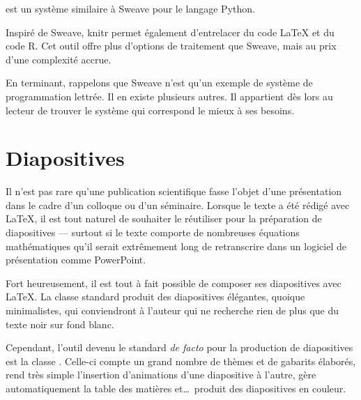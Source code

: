  est un système similaire à
Sweave pour le langage Python.

Inspiré de Sweave, knitr \citep{knitr} permet également d'entrelacer
du code {\LaTeX} et du code R. Cet outil offre plus d'options de
traitement que Sweave, mais au prix d'une complexité accrue.

En terminant, rappelons que Sweave n'est qu'un exemple de système de
programmation lettrée. Il en existe plusieurs autres. Il appartient
dès lors au lecteur de trouver le système qui correspond le mieux à
ses besoins.



\section{Diapositives}
\label{sec:trucs:diapositives}

Il n'est pas rare qu'une publication scientifique fasse l'objet d'une
présentation dans le cadre d'un colloque ou d'un séminaire. Lorsque le
texte a été rédigé avec {\LaTeX}, il est tout naturel de souhaiter le
réutiliser pour la préparation de diapositives --- surtout si le texte
comporte de nombreuses équations mathématiques qu'il serait
extrêmement long de retranscrire dans un logiciel de présentation
comme PowerPoint.

Fort heureusement, il est tout à fait possible de composer ses
diapositives avec {\LaTeX}. La classe standard  produit
des diapositives élégantes, quoique minimalistes, qui conviendront à
l'auteur qui ne recherche rien de plus que du texte noir sur fond
blanc.

Cependant, l'outil devenu le standard \emph{de facto} pour la
production de diapositives est la classe 
\citep{beamer}. Celle-ci compte un grand nombre de thèmes et de
gabarits élaborés, rend très simple l'insertion d'animations d'une
diapositive à l'autre, gère automatiquement la table des matières
et\dots\ produit des diapositives en couleur.

